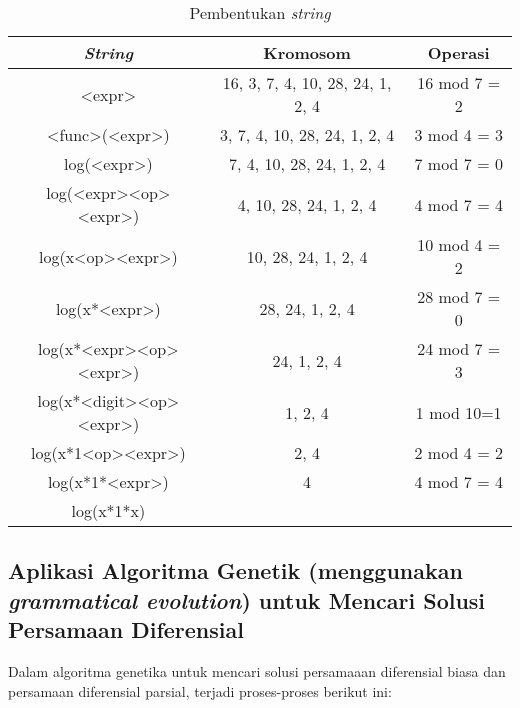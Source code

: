 \begin{table}[H]
\centering
\captionsetup{justification=centering}
\caption{Pembentukan \textit{string}}
\begin{tabular} { | c | c | c | }

\hline
\textit{String} & Kromosom & Operasi \\
\hline 
<expr> & 16, 3, 7, 4, 10, 28, 24, 1, 2, 4 & 16 mod 7 = 2 \\
\hline
<func>(<expr>) & 3, 7, 4, 10, 28, 24, 1, 2, 4 & 3 mod 4 = 3 \\
\hline
log(<expr>) & 7, 4, 10, 28, 24, 1, 2, 4  & 7 mod 7 = 0 \\
\hline
log(<expr><op><expr>) & 4, 10, 28, 24, 1, 2, 4 & 4 mod 7 = 4 \\
\hline
log(x<op><expr>) & 10, 28, 24, 1, 2, 4 & 10 mod 4 = 2 \\
\hline
log(x*<expr>) & 28, 24, 1, 2, 4 & 28 mod 7 = 0 \\
\hline
log(x*<expr><op><expr>) & 24, 1, 2, 4 & 24 mod 7 = 3 \\
\hline
log(x*<digit><op><expr>) & 1, 2, 4 & 1 mod 10=1 \\
\hline
log(x*1<op><expr>) & 2, 4 & 2 mod 4 = 2 \\
\hline
log(x*1*<expr>) & 4 & 4 mod 7 = 4 \\
\hline
log(x*1*x) & & \\
\hline
\end{tabular}
\label{tab:aa}
\end{table}

\subsection{Aplikasi Algoritma Genetik (menggunakan \textit{grammatical evolution}) untuk Mencari Solusi Persamaan Diferensial} %
\label{sec:appsAGsolusiPD}

Dalam algoritma genetika untuk mencari solusi persamaaan diferensial biasa dan persamaan diferensial parsial, terjadi proses-proses berikut ini:

